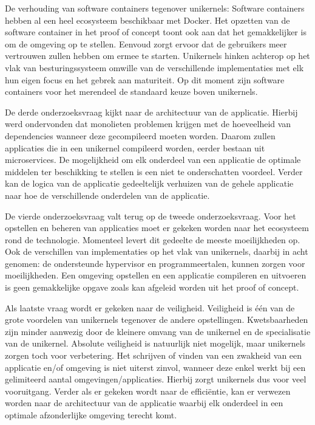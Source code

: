 \documentclass[pdftex,a4paper,12pt,twoside]{report}
\begin{document}
De verhouding van software containers tegenover unikernels: Software containers hebben al een heel ecosysteem beschikbaar met Docker. Het opzetten van de software container in het proof of concept toont ook aan dat het gemakkelijker is om de omgeving op te stellen. Eenvoud zorgt ervoor dat de gebruikers meer vertrouwen zullen hebben om ermee te starten. Unikernels hinken achterop op het vlak van besturingssysteem omwille van de verschillende implementaties met elk hun eigen focus en het gebrek aan maturiteit. Op dit moment zijn software containers voor het merendeel de standaard keuze boven unikernels.

De derde onderzoeksvraag kijkt naar de architectuur van de applicatie. Hierbij werd ondervonden dat monolieten problemen krijgen met de hoeveelheid van dependencies wanneer deze gecompileerd moeten worden. Daarom zullen applicaties die in een unikernel compileerd worden, eerder bestaan uit microservices. De mogelijkheid om elk onderdeel van een applicatie de optimale middelen ter beschikking te stellen is een niet te onderschatten voordeel. Verder kan de logica van de applicatie gedeeltelijk verhuizen van de gehele applicatie naar hoe de verschillende onderdelen van de applicatie.

De vierde onderzoeksvraag valt terug op de tweede onderzoeksvraag. Voor het opstellen en beheren van applicaties moet er gekeken worden naar het ecosysteem rond de technologie. Momenteel levert dit gedeelte de meeste moeilijkheden op. Ook de verschillen van implementaties op het vlak van unikernels, daarbij in acht genomen: de ondersteunde hypervisor en programmeertalen, kunnen zorgen voor moeilijkheden. Een omgeving opstellen en een applicatie compileren en uitvoeren is geen gemakkelijke opgave zoals kan afgeleid worden uit het proof of concept.

Als laatste vraag wordt er gekeken naar de veiligheid. Veiligheid is één van de grote voordelen van unikernels tegenover de andere opstellingen. Kwetsbaarheden zijn minder aanwezig door de kleinere omvang van de unikernel en de specialisatie van de unikernel. Absolute veiligheid is natuurlijk niet mogelijk, maar unikernels zorgen toch voor verbetering. Het schrijven of vinden van een zwakheid van een applicatie en/of omgeving is niet uiterst zinvol, wanneer deze enkel werkt bij een gelimiteerd aantal omgevingen/applicaties. Hierbij zorgt unikernels dus voor veel vooruitgang. Verder als er gekeken wordt naar de efficiëntie, kan er verwezen worden naar de architectuur van de applicatie waarbij elk onderdeel in een optimale afzonderlijke omgeving terecht komt.


\printbibliography[]

\listoffigures
\listoftables
\end{document}
